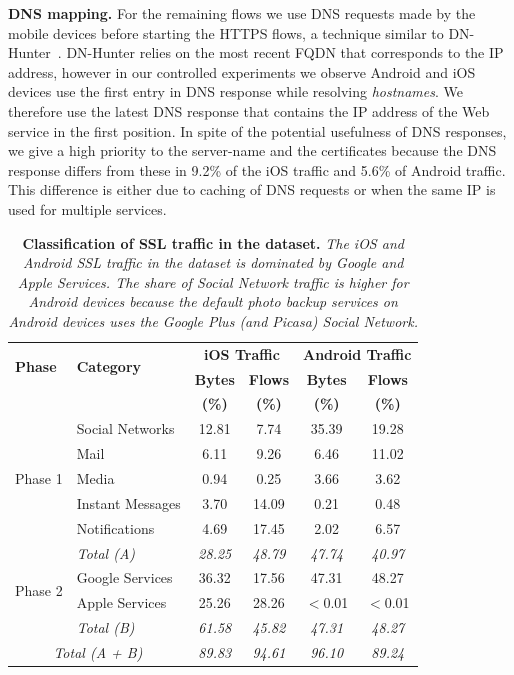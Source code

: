 \noindent\textbf{DNS mapping.} 
For the remaining flows we use DNS requests made by the mobile devices before starting the HTTPS flows, a technique similar to DN-Hunter~\cite{bermudez:dnhunter}.
DN-Hunter relies on the most recent FQDN that corresponds to the IP address, however in our controlled experiments we observe Android and iOS devices use the first entry in DNS response while resolving \emph{hostnames}.
We therefore use the latest DNS response that contains the IP address of the Web service in the first position.
In spite of the potential usefulness of DNS responses, we give a high priority to the server-name and the certificates because the DNS response differs from these in 9.2\% of the iOS traffic and 5.6\% of Android traffic.
This difference is either due to caching of DNS requests or when the same IP is used for multiple services. 

\begin{table}
\centering
\begin{small}
\begin{tabular}{|p{}|p{}|c|c|c|c|}
\hline
\multirow{2}{*}{\bf Phase} & \multirow{2}{*}{\bf Category} & \multicolumn{2}{c|}{\bf iOS Traffic} &  \multicolumn{2}{c|}{\bf Android Traffic} \tabularnewline
\cline{3-6}
 &         & {\bf Bytes}  & {\bf Flows} & {\bf Bytes} & {\bf Flows}   \tabularnewline
 &         & {\bf (\%)}  & {\bf (\%)} & {\bf (\%)} & {\bf (\%)}   \tabularnewline
\hline
\multirow{5}{*}{Phase 1}
& Social Networks    & 12.81 &  7.74 & 35.39 & 19.28 \tabularnewline
\cline{2-6}
& Mail               &  6.11 &  9.26 &  6.46 & 11.02 \tabularnewline
\cline{2-6}
& Media              &  0.94 &  0.25 &  3.66 &  3.62 \tabularnewline
\cline{2-6}
& Instant Messages   &  3.70 & 14.09 &  0.21 &  0.48 \tabularnewline
\cline{2-6}
& Notifications     &  4.69 & 17.45 &  2.02 &  6.57 \tabularnewline
\cline{2-6}
& \emph{Total (A) }       & {\em 28.25} & {\em 48.79} & {\em 47.74} & {\em 40.97} \tabularnewline
\hline
\multirow{2}{*}{Phase 2}
 & Google Services   & 36.32 & 17.56 & 47.31 & 48.27 \tabularnewline
\cline{2-6}
 & Apple Services    & 25.26 & 28.26 & $<$0.01 & $<$0.01 \tabularnewline
\cline{2-6}
& \emph{Total (B) }       & {\em 61.58} & {\em 45.82} & {\em 47.31} & {\em 48.27} \tabularnewline
\hline
\multicolumn{2}{|c|}{\emph{Total (A + B)}}       & {\em 89.83} & {\em 94.61} & {\em 96.10}  &  {\em 89.24} \tabularnewline
\hline
\end{tabular}
\end{small}
\caption{\textbf{Classification of SSL traffic in the \mobWild dataset.} \emph{The iOS and Android SSL traffic in the \mobWild dataset is dominated by Google and Apple Services. The share of Social Network traffic is higher for Android devices because the default photo backup services on Android devices uses the Google Plus (and Picasa) Social Network.}}
\label{tab:classify-ssl-traffic}
\end{table}

